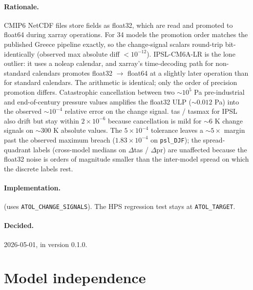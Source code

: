 \documentclass[11pt,a4paper]{article}
\begin{document}
\paragraph{Rationale.} CMIP6 NetCDF files store fields as float32, which
are read and promoted to float64 during xarray operations. For 34 models
the promotion order matches the published Greece pipeline exactly, so the
change-signal scalars round-trip bit-identically
(observed max absolute diff $< 10^{-12}$). IPSL-CM6A-LR is the lone
outlier: it uses a noleap calendar, and xarray's time-decoding path for
non-standard calendars promotes float32 $\to$ float64 at a slightly later
operation than for standard calendars. The arithmetic is identical;
only the order of precision promotion differs. Catastrophic cancellation
between two $\sim$$10^5$ Pa pre-industrial and end-of-century pressure
values amplifies the float32 ULP ($\sim$$0.012$ Pa) into the observed
$\sim$$10^{-4}$ relative error on the change signal. tas / tasmax for IPSL
also drift but stay within $2\!\times\!10^{-6}$ because cancellation is
mild for $\sim$$6$ K change signals on $\sim$$300$ K absolute values. The
$5\times 10^{-4}$ tolerance leaves a $\sim$$5\times$ margin past the
observed maximum breach ($1.83 \times 10^{-4}$ on
\texttt{psl\_DJF}); the spread-quadrant labels (cross-model medians on
$\Delta$tas / $\Delta$pr) are unaffected because the float32 noise is
orders of magnitude smaller than the inter-model spread on which the
discrete labels rest.

\paragraph{Implementation.}
(uses \texttt{ATOL\_CHANGE\_SIGNALS}). The HPS regression test stays at
\texttt{ATOL\_TARGET}.

\paragraph{Decided.} 2026-05-01, in version 0.1.0.

\section{Model independence}\label{sec:independence}
\end{document}

